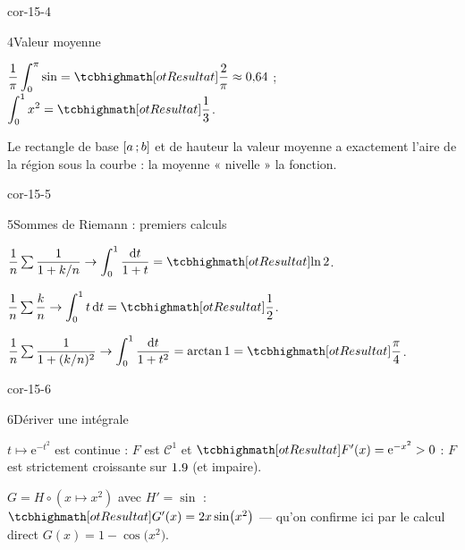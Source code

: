 \begin{blocLivre}{cor-15-4}
\begin{corrige}{4}{Valeur moyenne}
\begin{questions}
  \item $\dfrac1\pi\displaystyle\int_{0}^{\pi}\sin=\res{\dfrac2\pi}\approx0{,}64$ ;
    $\displaystyle\int_{0}^{1}x^{2}=\res{\dfrac13}$.
  \item Le rectangle de base $\mathopen{[}a\,{;}\,b\mathclose{]}$ et de hauteur la valeur
    moyenne a exactement l'aire de la région sous la courbe : la moyenne
    « nivelle » la fonction.
\end{questions}
\end{corrige}
\end{blocLivre}

\begin{blocLivre}{cor-15-5}
\begin{corrige}{5}{Sommes de Riemann : premiers calculs}
\begin{questions}
  \item $\dfrac1n\sum\dfrac{1}{1+k/n}\to
    \displaystyle\int_{0}^{1}\frac{\mathrm{d}t}{1+t}=\res{\ln2}$.
  \item $\dfrac1n\sum\dfrac kn\to\displaystyle\int_{0}^{1}t\,\mathrm{d}t
    =\res{\dfrac12}$.
  \item $\dfrac1n\sum\dfrac{1}{1+(k/n)^{2}}\to
    \displaystyle\int_{0}^{1}\frac{\mathrm{d}t}{1+t^{2}}
    =\arctan1=\res{\dfrac\pi4}$.
\end{questions}
\end{corrige}
\end{blocLivre}

\begin{blocLivre}{cor-15-6}
\begin{corrige}{6}{Dériver une intégrale}
\begin{questions}
  \item $t\mapsto\mathrm{e}^{-t^{2}}$ est continue : $F$ est
    $\mathcal{C}^{1}$ et $\res{F'(x)=\mathrm{e}^{-x^{2}}}>0$ : $F$ est
    strictement croissante sur $1.9$ (et impaire).
  \item $G=H\circ(x\mapsto x^{2})$ avec $H'=\sin$ :
    $\res{G'(x)=2x\sin\bigl(x^{2}\bigr)}$ — qu'on confirme ici par le
    calcul direct $G(x)=1-\cos\bigl(x^{2}\bigr)$.
\end{questions}
\end{corrige}
\end{blocLivre}

